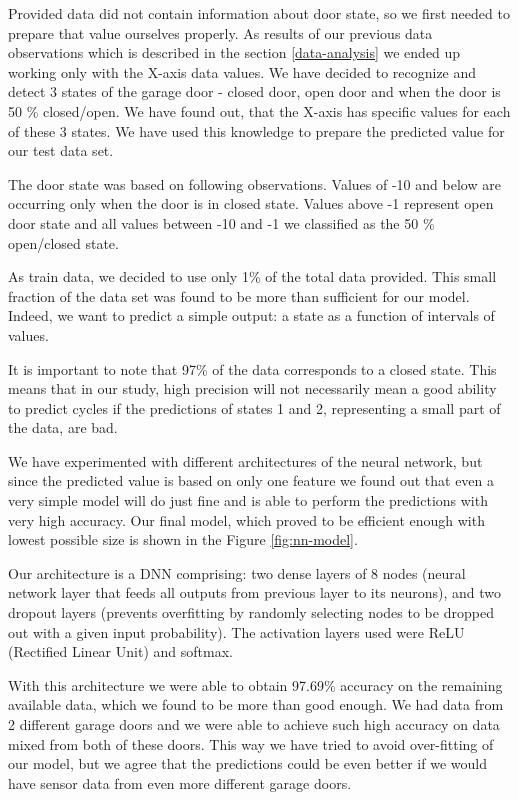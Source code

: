 \documentclass[12pt, letterpaper]{article}
\begin{document}
Provided data did not contain information about door state, so we first needed to prepare that value ourselves properly. As results of our previous data observations which is described in the section \ref{data-analysis} we ended up working only with the X-axis data values. We have decided to recognize and detect 3 states of the garage door - closed door, open door and when the door is 50 \% closed/open. We have found out, that the X-axis has specific values for each of these 3 states. We have used this knowledge to prepare the predicted value for our test data set.

The door state was based on following observations. Values of -10 and below are occurring only when the door is in closed state. Values above -1 represent open door state and all values between -10 and -1 we classified as the 50 \% open/closed state.

As train data, we decided to use only 1\% of the total data provided. This small fraction of the data set was found to be more than sufficient for our model. Indeed, we want to predict a simple output: a state as a function of intervals of values.

It is important to note that 97\% of the data corresponds to a closed state. This means that in our study, high precision will not necessarily mean a good ability to predict cycles if the predictions of states 1 and 2, representing a small part of the data, are bad.

We have experimented with different architectures of the neural network, but since the predicted value is based on only one feature we found out that even a very simple model will do just fine and is able to perform the predictions with very high accuracy. Our final model, which proved to be efficient enough with lowest possible size is shown in the Figure \ref{fig:nn-model}.

Our architecture is a DNN comprising: two dense layers of 8 nodes (neural network layer that feeds all outputs from previous layer to its neurons), and two dropout layers (prevents overfitting by randomly selecting nodes to be dropped out with a given input
probability). The activation layers used were ReLU (Rectified Linear Unit) and softmax.

With this architecture we were able to obtain 97.69\% accuracy on the remaining available data, which we found to be more than good enough. We had data from 2 different garage doors and we were able to achieve such high accuracy on data mixed from both of these doors. This way we have tried to avoid over-fitting of our model, but we agree that the predictions could be even better if we would have sensor data from even more different garage doors.
\end{document}
